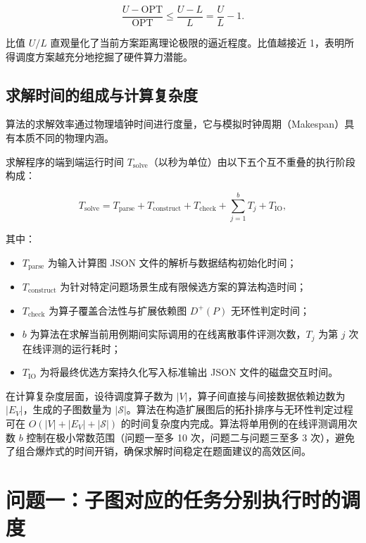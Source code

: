 \documentclass[anonymous,notoc]{gmcm2026}
\providecommand{\tightlist}{\setlength{\itemsep}{0pt}\setlength{\parskip}{0pt}}
\begin{document}
\begin{equation}
\frac{U - \mathrm{OPT}}{\mathrm{OPT}} \le \frac{U - L}{L} = \frac{U}{L} - 1.
\end{equation}

比值 \(U/L\) 直观量化了当前方案距离理论极限的逼近程度。比值越接近 1，表明所得调度方案越充分地挖掘了硬件算力潜能。

\subsection{求解时间的组成与计算复杂度}

算法的求解效率通过物理墙钟时间进行度量，它与模拟时钟周期（Makespan）具有本质不同的物理内涵。

求解程序的端到端运行时间 \(T_{\mathrm{solve}}\)（以秒为单位）由以下五个互不重叠的执行阶段构成：

\begin{equation}
T_{\mathrm{solve}} = T_{\mathrm{parse}} + T_{\mathrm{construct}} + T_{\mathrm{check}} + \sum_{j=1}^{b} T_j + T_{\mathrm{IO}},
\end{equation}

其中：

\begin{itemize}
\tightlist
\item
  \(T_{\mathrm{parse}}\) 为输入计算图 JSON 文件的解析与数据结构初始化时间；
\item
  \(T_{\mathrm{construct}}\) 为针对特定问题场景生成有限候选方案的算法构造时间；
\item
  \(T_{\mathrm{check}}\) 为算子覆盖合法性与扩展依赖图 \(D^+(P)\) 无环性判定时间；
\item
  \(b\) 为算法在求解当前用例期间实际调用的在线离散事件评测次数，\(T_j\) 为第 \(j\) 次在线评测的运行耗时；
\item
  \(T_{\mathrm{IO}}\) 为将最终优选方案持久化写入标准输出 JSON 文件的磁盘交互时间。
\end{itemize}

在计算复杂度层面，设待调度算子数为 \(|V|\)，算子间直接与间接数据依赖边数为 \(|E_V|\)，生成的子图数量为 \(|\mathcal{S}|\)。算法在构造扩展图后的拓扑排序与无环性判定过程可在 \(O(|V| + |E_V| + |\mathcal{S}|)\) 的时间复杂度内完成。算法将单用例的在线评测调用次数 \(b\) 控制在极小常数范围（问题一至多 10 次，问题二与问题三至多 3 次），避免了组合爆炸式的时间开销，确保求解时间稳定在题面建议的高效区间。


\section{问题一：子图对应的任务分别执行时的调度}
\end{document}
